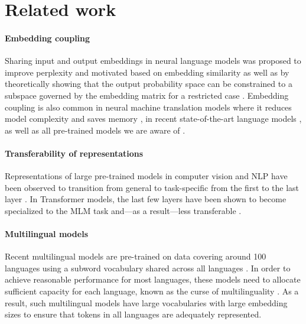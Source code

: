 \documentclass{article} \usepackage{iclr2021_conference,times}
\begin{document}
\section{Related work}
\label{sec:related_work}

\paragraph{Embedding coupling} Sharing input and output embeddings in neural language models was proposed to improve perplexity and motivated based on embedding similarity \citep{Press2017} as well as by theoretically showing that the output probability space can be constrained to a subspace governed by the embedding matrix for a restricted case \citep{Inan2017}. Embedding coupling is also common in neural machine translation models where it reduces model complexity \citep{Firat2016} and saves memory \citep{Johnson2017}, in recent state-of-the-art language models \citep{Melis2020mogrifier}, as well as all pre-trained models we are aware of \citep{Devlin2019,Liu2019roberta}.

\paragraph{Transferability of representations} Representations of large pre-trained models in computer vision and NLP have been observed to transition from general to task-specific from the first to the last layer \citep{yosinski2014transferable,Howard2018,Liu2019transferability}. In Transformer models, the last few layers have been shown to become specialized to the MLM task and---as a result---less transferable \citep{Zhang2020,Tamkin2020}.

\paragraph{Multilingual models} Recent multilingual models are pre-trained on data covering around 100 languages using a subword vocabulary shared across all languages \citep{Devlin2019,Pires2019,Conneau2020}. In order to achieve reasonable performance for most languages, these models need to allocate sufficient capacity for each language, known as the curse of multilinguality \citep{Conneau2020,Pfeiffer2020mad-x}. As a result, such multilingual models have large vocabularies with large embedding sizes to ensure that tokens in all languages are adequately represented. 
\end{document}
